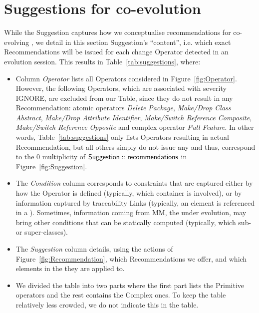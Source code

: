 \section{Suggestions for \viewtype co-evolution} 
\label{sec:Approach}

While the \textsf{Suggestion} \metamodel captures how we
conceptualise recommendations for co-evolving \viewtypes, we detail
in this section \textsf{Suggestion}'s ``content'', i.e. which exact \textsf{Recommendation}s
will be issued for each change \textsf{Operator} detected in an evolution
session. This results in Table~\ref{tab:suggestions}, where:
\begin{itemize}
	\item Column \textsl{Operator} lists all \textsf{Operator}s considered in Figure~\ref{fig:Operator}. 
    However, the following \textsf{Operator}s, which are
	associated with severity \textsf{IGNORE}, are excluded from our Table, since 
	they do not result in any \textsf{Recommendation}: atomic operators \textit{Delete Package}, 
	\textit{Make/Drop Class Abstract}, \textit{Make/Drop Attribute Identifier}, 
	\textit{Make/Switch Reference Composite}, \textit{Make/Switch Reference Opposite}
	and complex operator \textit{Pull Feature}. In other words, Table~\ref{tab:suggestions} only
	lists \textsf{Operator}s resulting in actual \textsf{Recommendation}, but all
	others simply do not issue any and thus, correspond to the \textsf{0} multiplicity
	of $\mathsf{Suggestion} \,\colon\!\!\!\colon \mathsf{recommendations}$ in Figure~\ref{fig:Suggestion}.
	
	\item The \textsl{Condition} column corresponds to constraints that are captured
	either by how the \textsf{Operator} is defined (typically, which \textsf{container}
	is involved), or by information captured by traceability \textsf{Link}s (typically,
	an element is referenced in a \viewtype). Sometimes, information coming from \textsf{MM},
	the \metamodel under evolution, may bring other conditions that can be statically
	computed (typically, which sub- or super-classes). 
	
	\item The \textsl{Suggestion} column details, using the actions of Figure~\ref{fig:Recommendation}, which \textsf{Recommendation}s we offer, and which elements in the \viewtype they are applied to.

    \item We divided the table into two parts where the first part lists the \textsf{Primitive} operators and the rest contains the \textsf{Complex} ones. To keep the table relatively less crowded, we do not indicate this in the table.
\end{itemize}

